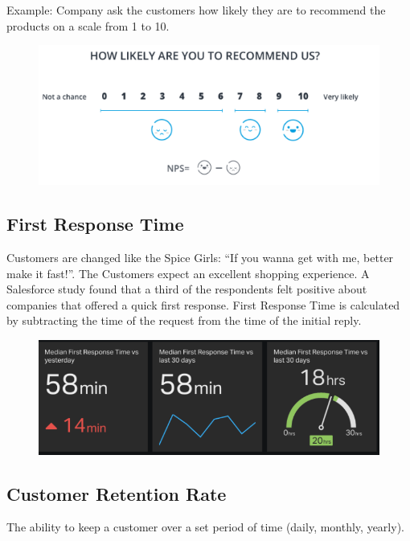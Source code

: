 \documentclass[]{book}
\begin{document}
Example: Company ask the customers how likely they are to recommend the
products on a scale from 1 to 10.

\begin{figure}
\centering
\includegraphics{nps.PNG}
\caption{}
\end{figure}

\subsection{First Response Time}\label{first-response-time}

Customers are changed like the Spice Girls: ``If you wanna get with me,
better make it fast!''. The Customers expect an excellent shopping
experience. A Salesforce study found that a third of the respondents
felt positive about companies that offered a quick first response. First
Response Time is calculated by subtracting the time of the request from
the time of the initial reply.

\begin{figure}
\centering
\includegraphics{ftr.PNG}
\caption{}
\end{figure}

\subsection{Customer Retention Rate}\label{customer-retention-rate}

The ability to keep a customer over a set period of time (daily,
monthly, yearly).
\end{document}
